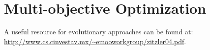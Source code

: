 \chapter{Multi-objective Optimization} \label{chap:multi-objective}

A useful resource for evolutionary approaches can be found at: \url{http://www.cs.cinvestav.mx/~emooworkgroup/zitzler04.pdf}.